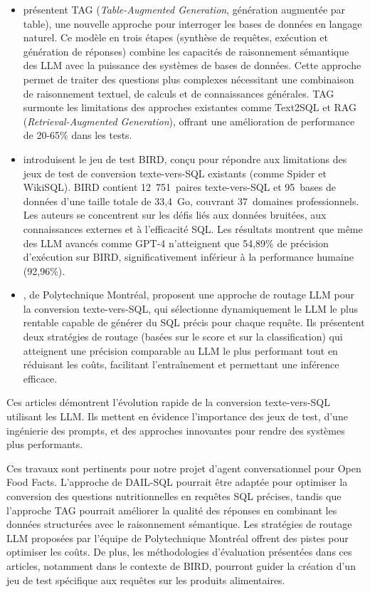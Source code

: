 \documentclass[a4paper,11pt]{article}
\begin{document}
\begin{itemize}
    \item \citet{biswal2024text2sql} présentent TAG (\textit{Table-Augmented Generation}, génération augmentée par table), une nouvelle approche pour interroger les bases de données en langage naturel. Ce modèle en trois étapes (synthèse de requêtes, exécution et génération de réponses) combine les capacités de raisonnement sémantique des LLM avec la puissance des systèmes de bases de données. 
    Cette approche permet de traiter des questions plus complexes nécessitant une combinaison de raisonnement textuel, de calculs et de connaissances générales.
    TAG surmonte les limitations des approches existantes comme Text2SQL et RAG (\textit{Retrieval-Augmented Generation}), offrant une amélioration de performance de 20-65\% dans les tests. 

    \item \citet{li2024can} introduisent le jeu de test BIRD, conçu pour répondre aux limitations des jeux de test de conversion texte-vers-SQL existants (comme Spider et WikiSQL). 
    BIRD contient 12~751~paires texte-vers-SQL et 95~bases de données d'une taille totale de 33,4~Go, couvrant 37~domaines professionnels. 
    Les auteurs se concentrent sur les défis liés aux données bruitées, aux connaissances externes et à l'efficacité SQL. 
    Les résultats montrent que même des LLM avancés comme GPT-4 n'atteignent que 54,89\% de précision d'exécution sur BIRD, significativement inférieur à la performance humaine (92,96\%).

    \item \citet{malekpour2024towards}, de Polytechnique Montréal, proposent une approche de routage LLM pour la conversion texte-vers-SQL, qui sélectionne dynamiquement le LLM le plus rentable capable de générer du SQL précis pour chaque requête. Ils présentent deux stratégies de routage (basées sur le score et sur la classification) qui atteignent une précision comparable au LLM le plus performant tout en réduisant les coûts, facilitant l'entraînement et permettant une inférence efficace.
\end{itemize}

Ces articles démontrent l'évolution rapide de la conversion texte-vers-SQL utilisant les LLM. 
Ils mettent en évidence l'importance des jeux de test, d'une ingénierie des prompts, et des approches innovantes 
pour rendre des systèmes plus performants.

Ces travaux sont pertinents pour notre projet d'agent conversationnel pour Open Food Facts. L'approche de DAIL-SQL pourrait être adaptée pour optimiser la conversion des questions nutritionnelles en requêtes SQL précises, tandis que l'approche TAG pourrait améliorer la qualité des réponses en combinant les données structurées avec le raisonnement sémantique. Les stratégies de routage LLM proposées par l'équipe de Polytechnique Montréal offrent des pistes pour optimiser les coûts. De plus, les méthodologies d'évaluation présentées dans ces articles, notamment dans le contexte de BIRD, pourront guider la création d'un jeu de test spécifique aux requêtes sur les produits alimentaires.
\end{document}
